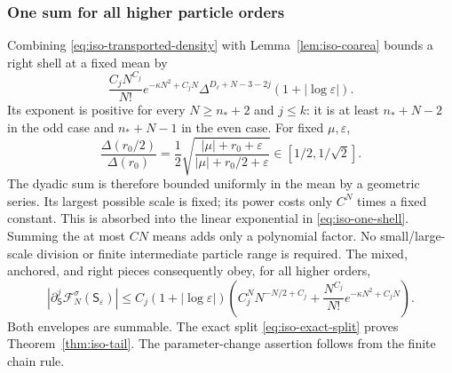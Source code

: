 \documentclass[11pt]{article}
\numberwithin{equation}{section}
\theoremstyle{definition}
\newcommand{\eps}{\varepsilon}
\begin{document}
\subsubsection{One sum for all higher particle orders}

Combining \eqref{eq:iso-transported-density} with
Lemma~\ref{lem:iso-coarea} bounds a right shell at a fixed mean by
\begin{equation}\label{eq:iso-one-shell}
 \frac{C_jN^{C_j}}{N!}e^{-\kappa N^2+C_jN}
 \Delta^{D_\ell+N-3-2j}(1+|\log\eps|).
\end{equation}
Its exponent is positive for every $N\ge n_*+2$ and $j\le k$:
it is at least $n_*+N-2$ in the odd case and $n_*+N-1$ in the
even case.  For fixed $\mu,\eps$,
\[
 \frac{\Delta(r_0/2)}{\Delta(r_0)}
 =\frac12\sqrt{\frac{|\mu|+r_0+\eps}{|\mu|+r_0/2+\eps}}
       \in[1/2,1/\sqrt2].
\]
The dyadic sum is therefore bounded uniformly in the mean by a geometric series.
Its largest possible scale is fixed; its power costs only $C^N$
times a fixed constant.  This is absorbed into the linear exponential
in \eqref{eq:iso-one-shell}.  Summing the at most $CN$ means adds
only a polynomial factor.  No small/large-scale division or finite
intermediate particle range is required.  The mixed, anchored, and
right pieces consequently obey, for all higher orders,
\begin{equation}\label{eq:iso-every-order-tail}
 |\partial_{\mathsf S}^j\mathcal F_N^\sigma(\mathsf S_\eps)|
 \le C_j(1+|\log\eps|)
 \left(C_j^NN^{-N/2+C_j}
       +\frac{N^{C_j}}{N!}e^{-\kappa N^2+C_jN}\right).
\end{equation}
Both envelopes are summable.  The exact split
\eqref{eq:iso-exact-split} proves Theorem~\ref{thm:iso-tail}.
The parameter-change assertion follows from the finite chain rule.
\end{document}
